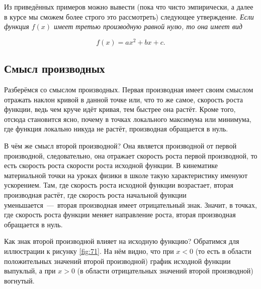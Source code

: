 \documentclass[12pt]{article}
\begin{document}
Из приведённых примеров можно вывести (пока что чисто эмпирически, а далее в курсе мы сможем более строго это рассмотреть) следующее утверждение. \emph{Если функция $f(x)$ имеет третью производную равной нулю, то она имеет вид} 

\begin{equation}
	f(x)=ax^2+bx+c.
\end{equation}

\subsection{Смысл производных}
Разберёмся со смыслом производных. Первая производная имеет своим смыслом отражать наклон кривой в данной точке или, что то же самое, скорость роста функции, ведь чем круче идёт кривая, тем быстрее она растёт. Кроме того, отсюда становится ясно, почему в точках локального максимума или минимума, где функция локально никуда не растёт, производная обращается в нуль. 

\par В чём же смысл второй производной? Она является производной от первой производной, следовательно, она отражает скорость роста первой производной, то есть скорость роста скорости роста исходной функции. В кинематике материальной точки на уроках физики в школе такую характеристику именуют ускорением. Там, где скорость роста исходной функции возрастает, вторая производная растёт, где скорость роста начальной функции уменьшается~\----~вторая производная имеет отрицательный знак. Значит, в точках, где скорость роста функции меняет направление роста, вторая производная обращается в нуль.

\par Как знак второй производной влияет на исходную функцию? Обратимся для иллюстрации к рисунку \ref{fig:71}. На нём видно, что при $x<0$ (то есть в области положительных значений второй производной) график исходной функции выпуклый, а при $x>0$ (в области отрицательных значений второй производной) вогнутый.
\end{document}
